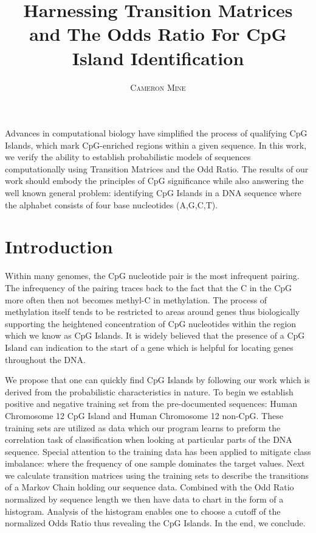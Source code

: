 \documentclass[paper=letter, fontsize=12pt]{article}
\title{\vspace{-15mm}\fontsize{24pt}{10pt}\selectfont\textbf{Harnessing Transition Matrices and The Odds Ratio For CpG Island Identification}} %
\author{
\large
{\textsc{Cameron Mine}}\\[2mm]
}
\date{}
\begin{document}
\maketitle %
\thispagestyle{fancy} %


Advances in computational biology have simplified the process of qualifying CpG Islands, which mark CpG-enriched regions within a given sequence. In this work, we verify the ability to establish probabilistic models of sequences computationally using Transition Matrices and the Odd Ratio. The results of our work should embody the principles of CpG significance while also answering the well known general problem: identifying CpG Islands in a DNA sequence where the alphabet consists of four base nucleotides (A,G,C,T).

\section{Introduction}

Within many genomes, the CpG nucleotide pair is the most infrequent pairing. The infrequency of the pairing traces back to the fact that the C in the CpG more often then not becomes methyl-C in methylation. The process of methylation itself tends to be restricted to areas around genes thus biologically supporting the heightened concentration of CpG nucleotides within the region which we know as CpG Islands. It is widely believed that the presence of a CpG Island can indication to the start of a gene which is helpful for locating genes throughout the DNA.

We propose that one can quickly find CpG Islands by following our work which is derived from the probabilistic characteristics in nature. To begin we establish positive and negative training set from the pre-documented sequences: Human Chromosome 12 CpG Island and Human Chromosome 12 non-CpG. These training sets are utilized as data which our program learns to preform the correlation task of classification when looking at particular parts of the DNA sequence. Special attention to the training data has been applied to mitigate class imbalance: where the frequency of one sample dominates the target values. Next we calculate transition matrices using the training sets to describe the transitions of a Markov Chain holding our sequence data. Combined with the Odd Ratio normalized by sequence length we then have data to chart in the form of a histogram. Analysis of the histogram enables one to choose a cutoff of the normalized Odds Ratio thus revealing the CpG Islands. In the end, we conclude.   
\end{document}
